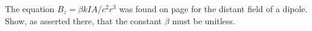 The equation $B_z=\beta kIA/c^2r^3$ was found on page \pageref{dipolederivn}
        for the distant field of a dipole. Show, as asserted there, that the
        constant $\beta$ must be unitless.
